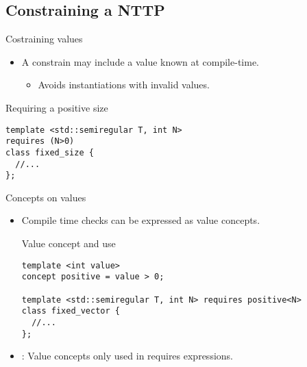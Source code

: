 \subsection{Constraining a NTTP}

\begin{frame}[t,fragile]{Costraining values}
\begin{itemize}
  \item A constrain may include a value known at compile-time.
    \begin{itemize}
      \item Avoids instantiations with invalid values.
    \end{itemize}
\end{itemize}

\begin{block}{Requiring a positive size}
\begin{lstlisting}
template <std::semiregular T, int N>
requires (N>0)
class fixed_size {
  //...
};
\end{lstlisting}
\end{block}

\end{frame}

\begin{frame}[t,fragile]{Concepts on values}
\begin{itemize}
  \item Compile time checks can be expressed as value concepts.

\begin{block}{Value concept and use}
\begin{lstlisting}
template <int value>
concept positive = value > 0;

template <std::semiregular T, int N> requires positive<N>
class fixed_vector {
  //...
};
\end{lstlisting}
\end{block}

  \item {}: Value concepts only used in requires expressions.

\end{itemize}
\end{frame}
